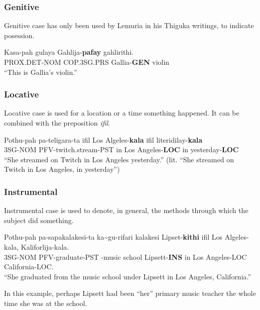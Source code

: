 \subsubsection{Genitive}
Genitive case has only been used by Lemuria in his Thiguka writings, to indicate posession.

\begin{exe}
\ex{} \gll{}Kasa-pah     gulaya     Gahlija-\textbf{pafay} gahlirithi.\\
            PROX.DET-NOM COP.3SG.PRS Gallia-\textbf{GEN}   violin\\
    \glt{}``This is Gallia's violin.''
\end{exe}

\newpage

\subsubsection{Locative}
Locative case is used for a location or a time something happened.
It can be combined with the preposition \textit{ifil}.

\begin{exe}
\ex{} \gll{}Pothu-pah pa-teligara-ta        ifil Los Algeles-\textbf{kala} ifil literidilay-\textbf{kala}\\
            3SG-NOM   PFV-twitch.stream-PST in   Los Angeles-\textbf{LOC}  in   yesterday-\textbf{LOC}\\
    \glt{}``She streamed on Twitch in Los Angeles yesterday.'' (lit. ``She streamed on Twitch in Los Angeles, in yesterday'')
\end{exe}

\subsubsection{Instrumental}
Instrumental case is used to denote, in general, the methods through which the subject did something.

\begin{exe}
\ex{} \gll{}Pothu-pah pa-sapakalakesi-ta ka\~{}gu-rifari  kalakesi Lipset-\textbf{kithi} ifil Los Algeles-kala, Kaliforlija-kala.\\
            3SG-NOM   PFV-graduate-PST   \agradj{}-music  school   Lipsett-\textbf{INS}  in   Los Angeles-LOC   California-LOC.\\
    \glt{}``She graduated from the music school under Lipsett in Los Angeles, California.''
\end{exe}
In this example, perhaps Lipsett had been ``her'' primary music teacher the whole time she was at the school.

\newpage{}
